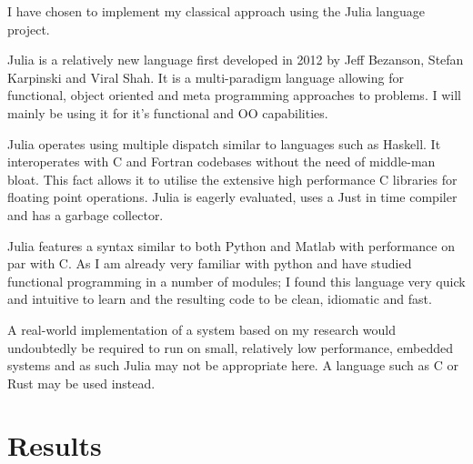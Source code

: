 I have chosen to implement my classical approach using the Julia language project\cite{JuliaProgrammingLanguage}.

Julia is a relatively new language first developed in 2012 by Jeff Bezanson, Stefan Karpinski and Viral Shah. It is a multi-paradigm language allowing for functional, object oriented and meta programming approaches to problems. I will mainly be using it for it's functional and OO capabilities. 

Julia operates using multiple dispatch similar to languages such as Haskell. It interoperates with C and Fortran codebases without the need of middle-man bloat. This fact allows it to utilise the extensive high performance C libraries for floating point operations. Julia is eagerly evaluated, uses a Just in time compiler and has a garbage collector.

Julia features a syntax similar to both Python and Matlab with performance on par with C. As I am already very familiar with python and have studied functional programming in a number of modules; I found this language very quick and intuitive to learn and the resulting code to be clean, idiomatic and fast.

A real-world implementation of a system based on my research would undoubtedly be required to run on small, relatively low performance, embedded systems and as such Julia may not be appropriate here. A language such as C or Rust may be used instead.
\section{Results}

